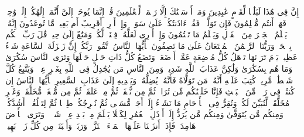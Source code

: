 \stopbuffer
\startbuffer[\q:21:106]
إِنَّ فِی هَٰذَا لَبَلَٰغࣰا لِّقَوۡمٍ عَٰبِدِینَ%
\stopbuffer
\startbuffer[\q:21:107]
وَمَاۤ أَرۡسَلۡنَٰكَ إِلَّا رَحۡمَةࣰ لِّلۡعَٰلَمِینَ%
\stopbuffer
\startbuffer[\q:21:108]
قُلۡ إِنَّمَا یُوحَىٰۤ إِلَیَّ أَنَّمَاۤ إِلَٰهُكُمۡ إِلَٰهࣱ وَٰحِدࣱۖ فَهَلۡ أَنتُم مُّسۡلِمُونَ%
\stopbuffer
\startbuffer[\q:21:109]
فَإِن تَوَلَّوۡا۟ فَقُلۡ ءَاذَنتُكُمۡ عَلَىٰ سَوَاۤءࣲۖ وَإِنۡ أَدۡرِیۤ أَقَرِیبٌ أَم بَعِیدࣱ مَّا تُوعَدُونَ%
\stopbuffer
\startbuffer[\q:21:110]
إِنَّهُۥ یَعۡلَمُ ٱلۡجَهۡرَ مِنَ ٱلۡقَوۡلِ وَیَعۡلَمُ مَا تَكۡتُمُونَ%
\stopbuffer
\startbuffer[\q:21:111]
وَإِنۡ أَدۡرِی لَعَلَّهُۥ فِتۡنَةࣱ لَّكُمۡ وَمَتَٰعٌ إِلَىٰ حِینࣲ%
\stopbuffer
\startbuffer[\q:21:112]
قَٰلَ رَبِّ ٱحۡكُم بِٱلۡحَقِّۗ وَرَبُّنَا ٱلرَّحۡمَٰنُ ٱلۡمُسۡتَعَانُ عَلَىٰ مَا تَصِفُونَ%
\stopbuffer
\startbuffer[\q:22:1]
یَٰۤأَیُّهَا ٱلنَّاسُ ٱتَّقُوا۟ رَبَّكُمۡۚ إِنَّ زَلۡزَلَةَ ٱلسَّاعَةِ شَیۡءٌ عَظِیمࣱ%
\stopbuffer
\startbuffer[\q:22:2]
یَوۡمَ تَرَوۡنَهَا تَذۡهَلُ كُلُّ مُرۡضِعَةٍ عَمَّاۤ أَرۡضَعَتۡ وَتَضَعُ كُلُّ ذَاتِ حَمۡلٍ حَمۡلَهَا وَتَرَى ٱلنَّاسَ سُكَٰرَىٰ وَمَا هُم بِسُكَٰرَىٰ وَلَٰكِنَّ عَذَابَ ٱللَّهِ شَدِیدࣱ%
\stopbuffer
\startbuffer[\q:22:3]
وَمِنَ ٱلنَّاسِ مَن یُجَٰدِلُ فِی ٱللَّهِ بِغَیۡرِ عِلۡمࣲ وَیَتَّبِعُ كُلَّ شَیۡطَٰنࣲ مَّرِیدࣲ%
\stopbuffer
\startbuffer[\q:22:4]
كُتِبَ عَلَیۡهِ أَنَّهُۥ مَن تَوَلَّاهُ فَأَنَّهُۥ یُضِلُّهُۥ وَیَهۡدِیهِ إِلَىٰ عَذَابِ ٱلسَّعِیرِ%
\stopbuffer
\startbuffer[\q:22:5]
یَٰۤأَیُّهَا ٱلنَّاسُ إِن كُنتُمۡ فِی رَیۡبࣲ مِّنَ ٱلۡبَعۡثِ فَإِنَّا خَلَقۡنَٰكُم مِّن تُرَابࣲ ثُمَّ مِن نُّطۡفَةࣲ ثُمَّ مِنۡ عَلَقَةࣲ ثُمَّ مِن مُّضۡغَةࣲ مُّخَلَّقَةࣲ وَغَیۡرِ مُخَلَّقَةࣲ لِّنُبَیِّنَ لَكُمۡۚ وَنُقِرُّ فِی ٱلۡأَرۡحَامِ مَا نَشَاۤءُ إِلَىٰۤ أَجَلࣲ مُّسَمࣰّى ثُمَّ نُخۡرِجُكُمۡ طِفۡلࣰا ثُمَّ لِتَبۡلُغُوۤا۟ أَشُدَّكُمۡۖ وَمِنكُم مَّن یُتَوَفَّىٰ وَمِنكُم مَّن یُرَدُّ إِلَىٰۤ أَرۡذَلِ ٱلۡعُمُرِ لِكَیۡلَا یَعۡلَمَ مِنۢ بَعۡدِ عِلۡمࣲ شَیۡءࣰاۚ وَتَرَى ٱلۡأَرۡضَ هَامِدَةࣰ فَإِذَاۤ أَنزَلۡنَا عَلَیۡهَا ٱلۡمَاۤءَ ٱهۡتَزَّتۡ وَرَبَتۡ وَأَنۢبَتَتۡ مِن كُلِّ زَوۡجِۭ بَهِیجࣲ%
\stopbuffer
